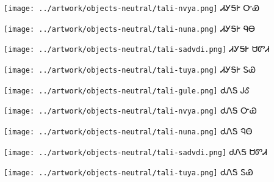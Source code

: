 \documentclass[avery5371,frame]{flashcards}%
\begin{document}
\begin{flashcard}{
\texttt{[image: ../artwork/objects-neutral/tali-nvya.png]}
}\Huge ᏗᎩᎦᎨ ᏅᏯ
\end{flashcard}

\begin{flashcard}{
\texttt{[image: ../artwork/objects-neutral/tali-nuna.png]}
}\Huge ᏗᎩᎦᎨ ᏄᎾ
\end{flashcard}

\begin{flashcard}{
\texttt{[image: ../artwork/objects-neutral/tali-sadvdi.png]}
}\Huge ᏗᎩᎦᎨ ᏌᏛᏗ
\end{flashcard}

\begin{flashcard}{
\texttt{[image: ../artwork/objects-neutral/tali-tuya.png]}
}\Huge ᏗᎩᎦᎨ ᏚᏯ
\end{flashcard}

\begin{flashcard}{
\texttt{[image: ../artwork/objects-neutral/tali-gule.png]}
}\Huge ᏧᏁᎦ ᎫᎴ
\end{flashcard}

\begin{flashcard}{
\texttt{[image: ../artwork/objects-neutral/tali-nvya.png]}
}\Huge ᏧᏁᎦ ᏅᏯ
\end{flashcard}

\begin{flashcard}{
\texttt{[image: ../artwork/objects-neutral/tali-nuna.png]}
}\Huge ᏧᏁᎦ ᏄᎾ
\end{flashcard}

\begin{flashcard}{
\texttt{[image: ../artwork/objects-neutral/tali-sadvdi.png]}
}\Huge ᏧᏁᎦ ᏌᏛᏗ
\end{flashcard}

\begin{flashcard}{
\texttt{[image: ../artwork/objects-neutral/tali-tuya.png]}
}\Huge ᏧᏁᎦ ᏚᏯ
\end{flashcard}
\end{document}

